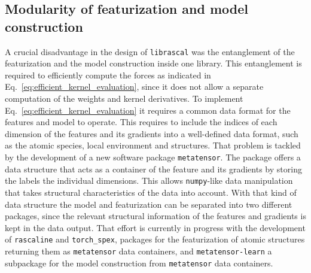 \subsection{Modularity of featurization and model construction}
A crucial disadvantage in the design of \texttt{librascal} was the entanglement of the featurization and the model construction inside one library.
This entanglement is required to efficiently compute the forces as indicated in Eq.~\eqref{eq:efficient_kernel_evaluation}, since it does not allow a separate computation of the weights and kernel derivatives.
To implement Eq.~\eqref{eq:efficient_kernel_evaluation} it requires a common data format for the features and model to operate.
This requires to include the indices of each dimension of the features and its gradients into a well-defined data format, such as the atomic species, local environment and structures.
That problem is tackled by the development of a new software package \texttt{metatensor}.
The package offers a data structure that acts as a container of the feature and its gradients by storing the labels the individual dimensions.
This allows \texttt{numpy}-like data manipulation that takes structural characteristics of the data into account.
With that kind of data structure the model and featurization can be separated into two different packages, since the relevant structural information of the features and gradients is kept in the data output.
That effort is currently in progress with the development of \texttt{rascaline} and \texttt{torch\_spex}, packages for the featurization of atomic structures returning them as \texttt{metatensor} data containers, and \texttt{metatensor-learn} a subpackage for the model construction from \texttt{metatensor} data containers.


